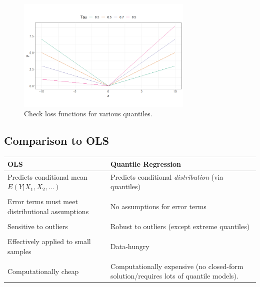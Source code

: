 \documentclass[12pt]{notes}
\begin{document}

\begin{minipage}[l][3cm][c]{\textwidth}

\end{minipage}

\begin{figure}[H]
\centering
\includegraphics[width=0.75\textwidth]{figures/module7/checkloss.png}
\caption{Check loss functions for various quantiles.}
\label{fig:checkloss}
\end{figure}

\subsection{Comparison to OLS}
\begin{tabular}{|p{9cm}|p{9cm}|}
\hline
\textbf{OLS} & \textbf{Quantile Regression} \\ 
\hline
Predicts conditional mean $E(Y|X_1, X_2, \ldots)$ & Predicts conditional \textit{distribution} (via quantiles) \\
& \\
Error terms must meet distributional assumptions & No assumptions for error terms \\
& \\
Sensitive to outliers  & Robust to outliers (except extreme quantiles) \\
& \\
Effectively applied to small samples & Data-hungry \\
& \\
Computationally cheap & Computationally expensive (no closed-form solution/requires lots of quantile models). \\
\hline
\end{tabular}
\end{document}
